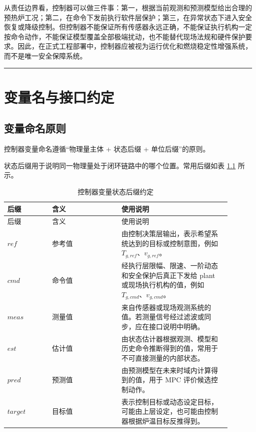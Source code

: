 \documentclass[UTF8,openany,zihao=-4,oneside]{ctexbook}
\newcommand{\manualdivider}{\par\vspace{0.6em}\noindent\textcolor{FGLine}{\rule{\linewidth}{0.7pt}}\vspace{0.6em}\par}
\begin{document}
从责任边界看，控制器可以做三件事：第一，根据当前观测和预测模型给出合理的预热炉工况；第二，在命令下发前执行软件层保护；第三，在异常状态下进入安全恢复或降级控制。但控制器不能保证所有传感器永远正确，不能保证执行机构一定按命令动作，不能保证模型覆盖全部极端扰动，也不能替代现场法规和硬件保护要求。因此，在正式工程部署中，控制器应被视为运行优化和燃烧稳定性增强系统，而不是唯一安全保障系统。

\manualdivider

\chapter{变量名与接口约定}\label{chap:variables-interfaces}

\section{变量命名原则}\label{sec:naming-principles}

控制器变量命名遵循“物理量主体 + 状态后缀 + 单位后缀”的原则。

状态后缀用于说明同一物理量处于闭环链路中的哪个位置。常用后缀如表 \ref{tab:suffix} 所示。

\begin{longtable}{@{}p{0.18\linewidth}p{0.28\linewidth}p{0.44\linewidth}@{}}
\caption{控制器变量状态后缀约定}\label{tab:suffix}\\
\toprule
后缀 & 含义 & 使用说明 \\
\midrule
\endfirsthead
\toprule
后缀 & 含义 & 使用说明 \\
\midrule
\endhead
\(ref\) & 参考值 & 由控制决策层输出，表示希望系统达到的目标或控制意图，例如 \(T_{g,ref}\)、\(v_{g,ref}\)。 \\
\(cmd\) & 命令值 & 经执行层限幅、限速、一阶动态和安全保护后真正下发给 plant 或现场执行机构的值，例如 \(T_{g,cmd}\)、\(v_{g,cmd}\)。 \\
\(meas\) & 测量值 & 来自传感器或现场观测系统的值。若测量信号经过滤波或同步，应在接口说明中明确。 \\
\(est\) & 估计值 & 由状态估计器根据观测、模型和历史命令推断得到的值，常用于不可直接测量的内部状态。 \\
\(pred\) & 预测值 & 由预测模型在未来时域内计算得到的值，用于 MPC 评价候选控制动作。 \\
\(target\) & 目标值 & 表示控制目标或动态设定目标，可能由上层设定，也可能由控制器根据炉温目标反推得到。 \\
\bottomrule
\end{longtable}
\end{document}
